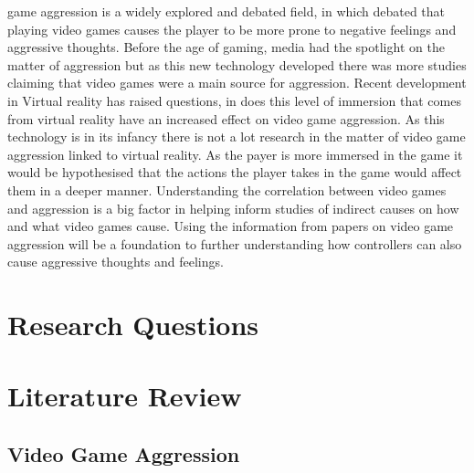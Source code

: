 \documentclass[journal]{IEEEtran}
\begin{document}
 game aggression is a widely explored and debated field, in which debated that playing video games causes the player to be more prone to negative feelings and aggressive thoughts. Before the age of gaming, media had the spotlight on the matter of aggression but as this new technology developed there was more studies claiming that video games were a main source for aggression. Recent development in Virtual reality has raised questions, in does this level of immersion that comes from virtual reality have an increased effect on video game aggression. As this technology is in its infancy there is not a lot research in the matter of video game aggression linked to virtual reality. As the payer is more immersed in the game it would be hypothesised that the actions the player takes in the game would affect them in a deeper manner.
Understanding the correlation between video games and aggression is a big factor in helping inform studies of indirect causes on how and what video games cause. Using the information from papers on video game aggression will be a foundation to further understanding how controllers can also cause aggressive thoughts and feelings.




\section{Research Questions}

\section{Literature Review}

    \subsection{Video Game Aggression}
   
\end{document}
